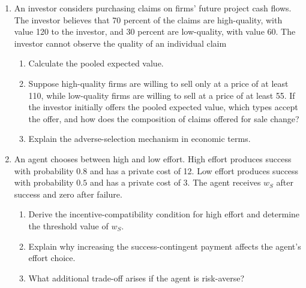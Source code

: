 

\begin{enumerate}

\item An investor considers purchasing claims on firms' future project cash flows. The investor believes that 70 percent of the claims are high-quality, with value 120 to the investor, and 30 percent are low-quality, with value 60. The investor cannot observe the quality of an individual claim
    \begin{enumerate}

    \item Calculate the pooled expected value.
    
    \item Suppose high-quality firms are willing to sell only at a price of at least 110, while low-quality firms are willing to sell at a price of at least 55. If the investor initially offers the pooled expected value, which types accept the offer, and how does the composition of claims offered for sale change?

    \item Explain the adverse-selection mechanism in economic terms.

    \end{enumerate}

\item An agent chooses between high and low effort. High effort produces success with probability $0.8$ and has a private cost of 12. Low effort produces success with probability $0.5$ and has a private cost of 3. The agent receives $w_S$ after success and zero after failure.

  \begin{enumerate}

  \item Derive the incentive-compatibility condition for high effort and determine the threshold value of $w_S$.

  \item Explain why increasing the success-contingent payment affects the agent's effort choice.

  \item What additional trade-off arises if the agent is risk-averse?

  \end{enumerate}


\end{enumerate}
